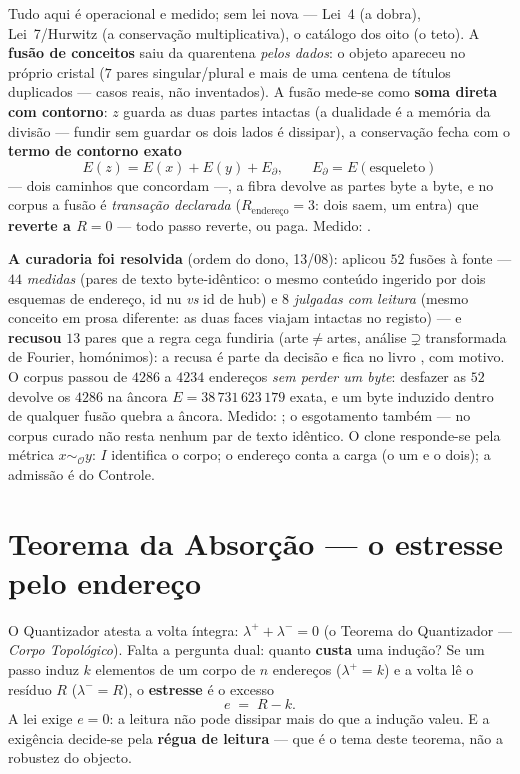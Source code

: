 \documentclass[livro.tex]{subfiles}
\begin{document}
\begin{observacao}
Tudo aqui é operacional e medido; sem lei nova --- Lei~4 (a dobra),
Lei~7/Hurwitz (a conservação multiplicativa), o catálogo dos oito (o
teto). A \textbf{fusão de conceitos} saiu da quarentena \emph{pelos
dados}: o objeto apareceu no próprio cristal ($7$ pares
singular/plural e mais de uma centena de títulos duplicados --- casos
reais, não inventados). A fusão mede-se como \textbf{soma direta com
contorno}: $z$ guarda as duas partes intactas (a dualidade é a memória
da divisão --- fundir sem guardar os dois lados é dissipar), a
conservação fecha com o \textbf{termo de contorno exato}
\[
\boxed{E(z)=E(x)+E(y)+E_{\partial},\qquad E_{\partial}=E(\text{esqueleto})}
\]
--- dois caminhos que concordam ---, a fibra devolve as partes byte a
byte, e no corpus a fusão é \emph{transação declarada}
($R_{\mathrm{endereço}}=3$: dois saem, um entra) que \textbf{reverte a
$R=0$} --- todo passo reverte, ou paga. Medido:
.

\textbf{A curadoria foi resolvida} (ordem do dono, 13/08):
 aplicou $52$ fusões à fonte --- $44$
\emph{medidas} (pares de texto byte-idêntico: o mesmo conteúdo ingerido
por dois esquemas de endereço, id nu \emph{vs} id de hub) e $8$
\emph{julgadas com leitura} (mesmo conceito em prosa diferente: as duas
faces viajam intactas no registo) --- e \textbf{recusou} $13$ pares que
a regra cega fundiria (arte$\neq$artes, análise$\supsetneq$transformada
de Fourier, homónimos): a recusa é parte da decisão e fica no livro
, com motivo. O corpus passou de $4286$ a
$4234$ endereços \emph{sem perder um byte}: desfazer as $52$ devolve os
$4286$ na âncora $E=38\,731\,623\,179$ exata, e um byte induzido dentro
de qualquer fusão quebra a âncora. Medido:
; o esgotamento também --- no corpus
curado não resta nenhum par de texto idêntico.
O clone responde-se pela métrica $x\sim_{\mathcal O}y$: $I$ identifica
o corpo; o endereço conta a carga (o um e o dois); a admissão é do
Controle.
\end{observacao}

\section{Teorema da Absorção --- o estresse pelo endereço}\label{sec:absorcao}

O Quantizador atesta a volta íntegra: $\lambda^{+}+\lambda^{-}=0$
(o Teorema do Quantizador --- \emph{Corpo Topológico}). Falta a pergunta dual: quanto \textbf{custa}
uma indução? Se um passo induz $k$ elementos de um corpo de $n$
endereços ($\lambda^{+}=k$) e a volta lê o resíduo $R$ ($\lambda^{-}=R$),
o \textbf{estresse} é o excesso
\[
\boxed{e \;=\; R - k.}
\]
A lei exige $e=0$: a leitura não pode dissipar mais do que a indução
valeu. E a exigência decide-se pela \textbf{régua de leitura} --- que é o
tema deste teorema, não a robustez do objecto.
\end{document}
